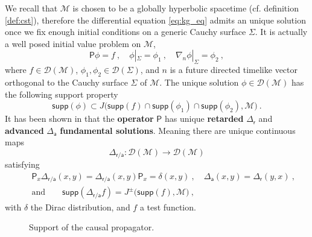 \documentclass[11pt]{book}
\newcommand{\supp}{\mathsf{supp}}
\newcommand{\Dcal}{\mathcal{D}}
\newcommand{\Mcal}{\mathcal{M}}
\newcommand{\Psf}{\mathsf{P}}
\newcommand{\asf}{\mathsf{a}}
\newcommand{\rsf}{\mathsf{r}}
\theoremstyle{break}
\begin{document}
We recall that $\Mcal$ is chosen to be a globally hyperbolic spacetime (cf. definition \ref{def:cst}), therefore the differential equation \eqref{eq:kg_eq} admits an unique solution once we fix enough initial conditions on a generic Cauchy surface $\Sigma$. It is actually a well posed initial value problem on $\Mcal$,
%
\begin{equation}
\Psf \phi = f \ , \quad \phi|_\Sigma = \phi_1 \ , \quad \nabla_n \phi |_\Sigma = \phi_2 \ ,
\label{eq:init_val_pb}
\end{equation}
%
where $f \in \Dcal(\Mcal)$, $\phi_1, \phi_2 \in \Dcal(\Sigma)$, and $n$ is a future directed timelike vector orthogonal to the Cauchy surface $\Sigma$ of $\Mcal$. The unique solution $\phi \in \Dcal(\Mcal)$ has the following support property
%
\begin{equation*}
\supp(\phi) \subset J\bigg( \supp(f) \cap \supp(\phi_1) \cap \supp(\phi_2),\Mcal \bigg) \ .
\end{equation*}
%
It has been shown in \cite{baer_wave_2008} that the \textbf{operator} $\Psf$ has unique \textbf{retarded} $\Delta_\rsf$ and \textbf{advanced} $\Delta_\asf$ \textbf{fundamental solutions}. Meaning there are unique continuous maps 
%
\begin{equation*}
\Delta_{\rsf / \asf} : \Dcal(\Mcal) \to \Dcal(\Mcal)  
\end{equation*}
%
satisfying 
%
\begin{eqnarray*}
&& \Psf_x \Delta_{\rsf/\asf}(x,y) = \Delta_{\rsf/\asf}(x,y) \Psf_x = \delta(x,y) \ , 
\quad \Delta_{\asf}(x,y) = \Delta_{\rsf}(y,x) \ , \\
&& \mbox{and} \qquad \supp(\Delta_{\rsf/\asf} f) = J^{\pm} \bigg(\supp(f) , \Mcal\bigg) \ ,
\end{eqnarray*}
%
with $\delta$ the Dirac distribution, and $f$ a test function.


\begin{figure}
\vspace*{-20pt}
\begin{center}
\end{center}
\label{fig:supp_causal_prop}
\caption{Support of the causal propagator.}
\vspace*{10pt}
\end{figure}
\end{document}

